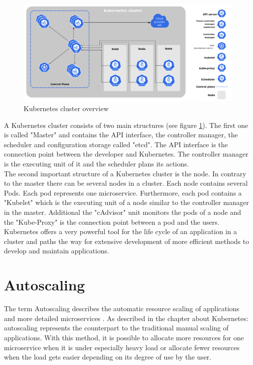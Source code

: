 \documentclass[
	english,
	ruledheaders=section,%
	class=report,%
	thesis={type=master},%
	accentcolor=8c,%
	custommargins=true,%
	marginpar=false,%
	parskip=half-,%
	fontsize=11pt,%
]{tudapub}
\begin{document}
\begin{figure}[h]
    \centering
    \includegraphics[width=\textwidth]{data/basics/kubernetes-cluster.png}
    \caption{Kubernetes cluster overview \cite{kubernetesdoc2020}}
    \label{fig:kubernetes-cluster}
\end{figure}

A Kubernetes cluster consists of two main structures (see figure \ref{fig:kubernetes-cluster}). The first one is called "Master" and contains the API interface, the controller manager, the scheduler and configuration storage called "etcd". The API interface is the connection point between the developer and Kubernetes. The controller manager is the executing unit of it and the scheduler plans its actions.\\ The second important structure of a Kubernetes cluster is the node. In contrary to the master there can be several nodes in a cluster. Each node contains several Pods. Each pod represents one microservice. Furthermore, each pod contains a "Kubelet" which is the executing unit of a node similar to the controller manager in the master. Additional the "cAdvisor" unit monitors the pods of a node and the "Kube-Proxy" is the connection point between a pod and the users.\\

Kubernetes offers a very powerful tool for the life cycle of an application in a cluster and paths the way for extensive development of more efficient methods to develop and maintain applications.
\newpage
\section{Autoscaling}
The term Autoscaling describes the automatic resource scaling of applications and more detailed microservices \cite{qu2018auto, midigudla2019performance}. As described in the chapter about Kubernetes: autoscaling represents the counterpart to the traditional manual scaling of applications. With this method, it is possible to allocate more resources for one microservice when it is under especially heavy load or allocate fewer resources when the load gets easier depending on its degree of use by the user.\\
\end{document}
